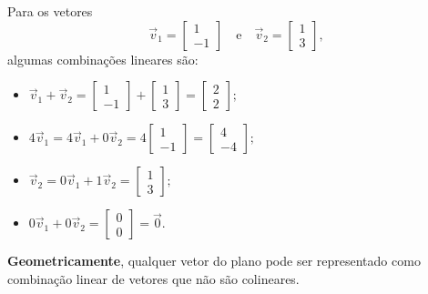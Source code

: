 \begin{ex}
	Para os vetores
	\begin{equation}
	\vec{v}_1 = \left[
	\begin{array}{c}
	1 \\
	-1
	\end{array}
	\right] \quad \text{e} \quad
	\vec{v}_2 = \left[
	\begin{array}{c}
	1 \\
	3
	\end{array}
	\right],
	\end{equation} algumas combinações lineares são:
	\begin{itemize}
		\item $\vec{v}_1 + \vec{v}_2 =
		\left[
		\begin{array}{c}
		1 \\
		-1
		\end{array}
		\right] +
		\left[
		\begin{array}{c}
		1 \\
		3
		\end{array}
		\right] =
		\left[
		\begin{array}{c}
		2 \\
		2
		\end{array}
		\right];$
		\item $ 4 \vec{v}_1 = 4 \vec{v}_1 + 0 \vec{v}_2 =
		4 \left[
		\begin{array}{c}
		1 \\
		-1
		\end{array}
		\right] =
		\left[
		\begin{array}{c}
		4 \\
		-4
		\end{array}
		\right];$
		\item $ \vec{v}_2 = 0\vec{v}_1 + 1\vec{v}_2 =
		\left[
		\begin{array}{c}
		1 \\
		3
		\end{array}
		\right];$
		\item $0\vec{v}_1 + 0 \vec{v}_2 =
		\left[
		\begin{array}{c}
		0 \\
		0
		\end{array}
		\right] = \vec{0}.$
	\end{itemize} \textbf{Geometricamente}, qualquer vetor do plano pode ser representado como combinação linear de vetores que não são colineares.
	

\end{ex}

